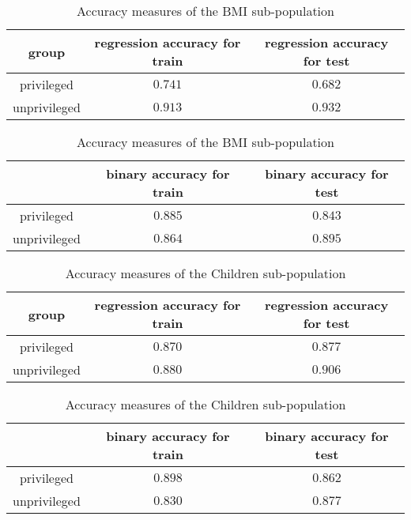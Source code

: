 \documentclass[10pt]{article}
\begin{document}
\begin{table}[h!]
    \centering
    \begin{tabular}{c|c|c}
         group & regression accuracy for train& regression accuracy for test\\
         \hline
         \hline
         privileged & \(0.741\) & \(0.682\)\\
         \hline
         unprivileged & \(0.913\) & \(0.932\)
    \end{tabular}
    \vspace{3pt}
    \begin{tabular}{c|c|c}
          & \hphantom{re}binary accuracy for train\hphantom{re}& \hphantom{re}binary accuracy for test\hphantom{re}\\
         \hline
         \hline
         privileged & \(0.885\) & \(0.843\)\\
         \hline
         unprivileged & \(0.864\) & \(0.895\)
    \end{tabular}
    \vspace{3pt}
    \caption{Accuracy measures of the BMI sub-population}
    \label{tab:acc_bmi}
\end{table}

\begin{table}[h!]
    \centering
    \begin{tabular}{c|c|c}
         group & regression accuracy for train& regression accuracy for test\\
         \hline
         \hline
         privileged & \(0.870\) & \(0.877\)\\
         \hline
         unprivileged & \(0.880\) & \(0.906\)
    \end{tabular}
    \vspace{3pt}
    \begin{tabular}{c|c|c}
          & \hphantom{re}binary accuracy for train\hphantom{re}& \hphantom{re}binary accuracy for test\hphantom{re}\\
         \hline
         \hline
         privileged & \(0.898\) & \(0.862\)\\
         \hline
         unprivileged & \(0.830\) & \(0.877\)
    \end{tabular}
    \vspace{3pt}
    \caption{Accuracy measures of the Children sub-population}
    \label{tab:acc_child}
\end{table}
\end{document}
